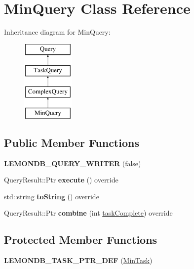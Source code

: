 \hypertarget{class_min_query}{}\section{Min\+Query Class Reference}
\label{class_min_query}
Inheritance diagram for Min\+Query\+:\begin{figure}[H]
\begin{center}
\leavevmode
\includegraphics[height=4.000000cm]{class_min_query}
\end{center}
\end{figure}
\subsection*{Public Member Functions}
\begin{DoxyCompactItemize}
\item 
\mbox{\label{class_min_query_a42476dc9ba9c545ef508389e2966a573}} 
{\bfseries L\+E\+M\+O\+N\+D\+B\+\_\+\+Q\+U\+E\+R\+Y\+\_\+\+W\+R\+I\+T\+ER} (false)
\item 
\mbox{\label{class_min_query_adbb717679491888982d95631438d2820}} 
Query\+Result\+::\+Ptr {\bfseries execute} () override
\item 
\mbox{\label{class_min_query_a46649bffc86277375a11ebfcc9095804}} 
std\+::string {\bfseries to\+String} () override
\item 
\mbox{\label{class_min_query_acf20a13f11058d63fbf69d9260e4e445}} 
Query\+Result\+::\+Ptr {\bfseries combine} (int \hyperlink{class_task_query_a3dc3e4c56ddea8ff025239fd9da358d3}{task\+Complete}) override
\end{DoxyCompactItemize}
\subsection*{Protected Member Functions}
\begin{DoxyCompactItemize}
\item 
\mbox{\label{class_min_query_a9113a3e2478eeefc09ca74f6df8ee451}} 
{\bfseries L\+E\+M\+O\+N\+D\+B\+\_\+\+T\+A\+S\+K\+\_\+\+P\+T\+R\+\_\+\+D\+EF} (\hyperlink{class_min_task}{Min\+Task})
\end{DoxyCompactItemize}

